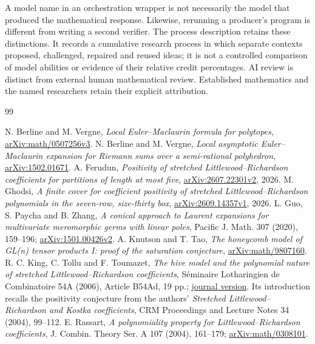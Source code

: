 \documentclass[11pt]{article}
\theoremstyle{definition}\newtheorem{definition}[theorem]{Definition}
\theoremstyle{remark}\newtheorem{remark}[theorem]{Remark}
\begin{document}
A model name in an orchestration wrapper is not necessarily the model that
produced the mathematical response. Likewise, rerunning a producer's program
is different from writing a second verifier. The process description retains
these distinctions. It records a cumulative research process in which
separate contexts proposed, challenged, repaired and reused ideas; it is not
a controlled comparison of model abilities or evidence of their relative
credit percentages. AI review is distinct from external human mathematical
review. Established mathematics and the named researchers retain their
explicit attribution.

\begin{thebibliography}{99}
\raggedright
{} N. Berline and M. Vergne,
\emph{Local Euler--Maclaurin formula for polytopes},
\href{https://arxiv.org/abs/math/0507256v3}{arXiv:math/0507256v3}.
 N. Berline and M. Vergne,
\emph{Local asymptotic Euler--Maclaurin expansion for Riemann sums over a
semi-rational polyhedron},
\href{https://arxiv.org/abs/1502.01671}{arXiv:1502.01671}.
 A. Ferudun,
\emph{Positivity of stretched Littlewood--Richardson coefficients for
partitions of length at most five},
\href{https://arxiv.org/abs/2607.22301v2}{arXiv:2607.22301v2}, 2026.
 M. Ghodsi,
\emph{A finite cover for coefficient positivity of stretched
Littlewood--Richardson polynomials in the seven-row, size-thirty box},
\href{https://arxiv.org/abs/2609.14357v1}{arXiv:2609.14357v1}, 2026.
 L. Guo, S. Paycha and B. Zhang,
\emph{A conical approach to Laurent expansions for multivariate meromorphic
germs with linear poles}, Pacific J. Math. 307 (2020), 159--196;
\href{https://arxiv.org/abs/1501.00426v2}{arXiv:1501.00426v2}.
 A. Knutson and T. Tao,
\emph{The honeycomb model of GL(n) tensor products I: proof of the saturation
conjecture}, \href{https://arxiv.org/abs/math/9807160}{arXiv:math/9807160}.
 R. C. King, C. Tollu and F. Toumazet,
\emph{The hive model and the polynomial nature of stretched
Littlewood--Richardson coefficients}, S\'eminaire Lotharingien de Combinatoire
54A (2006), Article B54Ad, 19 pp.;
\href{https://www.mat.univie.ac.at/~slc/wpapers/s54Akitoto1.pdf}{journal version}.
Its introduction recalls the positivity conjecture from the authors'
\emph{Stretched Littlewood--Richardson and Kostka coefficients},
CRM Proceedings and Lecture Notes 34 (2004), 99--112.
 E. Rassart,
\emph{A polynomiality property for Littlewood--Richardson coefficients},
J. Combin. Theory Ser. A 107 (2004), 161--179;
\href{https://arxiv.org/abs/math/0308101}{arXiv:math/0308101}.
\end{thebibliography}
\end{document}
